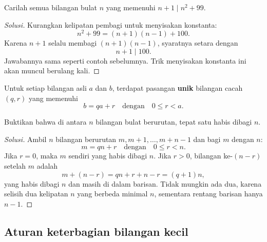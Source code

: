 \documentclass[12pt]{scrartcl}
\begin{document}
\begin{example}
Carilah semua bilangan bulat $n$ yang memenuhi $n + 1 \mid n^2 + 99$.
\end{example}
\begin{proof}[Solusi]
Kurangkan kelipatan pembagi untuk menyisakan konstanta:
\[ n^2 + 99 = (n + 1)(n - 1) + 100. \]
Karena $n + 1$ selalu membagi $(n + 1)(n - 1)$, syaratnya setara dengan
\[ n + 1 \mid 100. \]
Jawabannya sama seperti contoh sebelumnya.
Trik menyisakan konstanta ini akan muncul berulang kali.
\end{proof}

\begin{theorem}
Untuk setiap bilangan asli $a$ dan $b$, terdapat pasangan \textbf{unik}
bilangan cacah $(q, r)$ yang memenuhi
\[ b = qa + r \quad \text{dengan} \quad 0 \le r < a. \]
\end{theorem}

\begin{example}
Buktikan bahwa di antara $n$ bilangan bulat berurutan, tepat satu habis dibagi $n$.
\end{example}
\begin{proof}[Solusi]
Ambil $n$ bilangan berurutan $m, m + 1, \dots, m + n - 1$ dan bagi $m$ dengan $n$:
\[ m = qn + r \quad \text{dengan} \quad 0 \le r < n. \]
Jika $r = 0$, maka $m$ sendiri yang habis dibagi $n$.
Jika $r > 0$, bilangan ke-$(n - r)$ setelah $m$ adalah
\[ m + (n - r) = qn + r + n - r = (q + 1)n, \]
yang habis dibagi $n$ dan masih di dalam barisan.
Tidak mungkin ada dua, karena selisih dua kelipatan $n$ yang berbeda minimal $n$,
sementara rentang barisan hanya $n - 1$.
\end{proof}

\subsection{Aturan keterbagian bilangan kecil}
\end{document}
